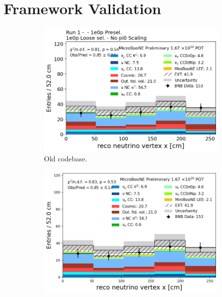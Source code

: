 \section{Framework Validation}
\label{appendix:FrameworkValidation}

\begin{figure}[H]
    \centering
    \begin{subfigure}[t]{0.32\linewidth}
        \includegraphics[width=\linewidth]{technote/Appendix_Validation/Figures/1e0p_Loose/Run1_Vertex_X_Old.png}
        \caption{Old codebase.}
    \end{subfigure}%
    \hspace{0.2cm}%
    \begin{subfigure}[t]{0.32\linewidth}
        \includegraphics[width=\linewidth]{technote/Appendix_Validation/Figures/1e0p_Loose/Run1_Vertex_X_Chris.png}

\end{subfigure}
\end{figure}
